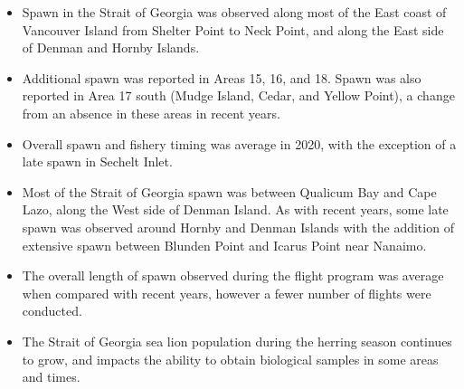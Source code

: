 \begin{itemize}

\item Spawn in the Strait of Georgia was observed along most of the East coast of Vancouver Island from Shelter Point to Neck Point, and along the East side of Denman and Hornby Islands.

\item Additional spawn was reported in Areas 15, 16, and 18.
Spawn was also reported in Area 17 south (Mudge Island, Cedar, and Yellow Point), a change from an absence in these areas in recent years.

\item Overall spawn and fishery timing was average in 2020, with the exception of a late spawn in Sechelt Inlet.

\item Most of the Strait of Georgia spawn was between Qualicum Bay and Cape Lazo, along the West side of Denman Island.
As with recent years, some late spawn was observed around Hornby and Denman Islands with the addition of extensive spawn between Blunden Point and Icarus Point near Nanaimo.

\item The overall length of spawn observed during the flight program was average when compared with recent years, however a fewer number of flights were conducted.

\item The Strait of Georgia sea lion population during the herring season continues to grow, and impacts the ability to obtain biological samples in some areas and times.

\end{itemize}